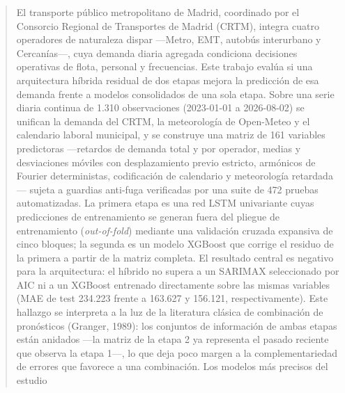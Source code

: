 
\begin{abstract}

  El transporte público metropolitano de Madrid, coordinado por el Consorcio
  Regional de Transportes de Madrid (CRTM), integra cuatro operadores de
  naturaleza dispar ---Metro, EMT, autobús interurbano y Cercanías---, cuya
  demanda diaria agregada condiciona decisiones operativas de flota, personal y
  frecuencias. Este trabajo evalúa si una arquitectura híbrida residual de dos
  etapas mejora la predicción de esa demanda frente a modelos consolidados de una
  sola etapa. Sobre una serie diaria continua de 1.310 observaciones (2023-01-01 a
  2026-08-02) se unifican la demanda del CRTM, la meteorología de Open-Meteo y el
  calendario laboral municipal, y se construye una matriz de 161 variables
  predictoras ---retardos de demanda total y por operador, medias y desviaciones
  móviles con desplazamiento previo estricto, armónicos de Fourier deterministas,
  codificación de calendario y meteorología retardada--- sujeta a guardias
  anti-fuga verificadas por una suite de 472 pruebas automatizadas. La primera
  etapa es una red LSTM univariante cuyas predicciones de entrenamiento se generan
  fuera del pliegue de entrenamiento (\emph{out-of-fold}) mediante una validación
  cruzada expansiva de cinco bloques; la segunda es un modelo XGBoost que corrige
  el residuo de la primera a partir de la matriz completa. El resultado central es
  negativo para la arquitectura: el híbrido no supera a un SARIMAX seleccionado por
  AIC ni a un XGBoost entrenado directamente sobre las mismas variables (MAE de
  test 234.223 frente a 163.627 y 156.121, respectivamente). Este hallazgo se
  interpreta a la luz de la literatura clásica de combinación de pronósticos
  (Granger, 1989): los conjuntos de información de ambas etapas están anidados
  ---la matriz de la etapa 2 ya representa el pasado reciente que observa la etapa
  1---, lo que deja poco margen a la complementariedad de errores que favorece a
  una combinación. Los modelos más precisos del estudio

\end{abstract}
